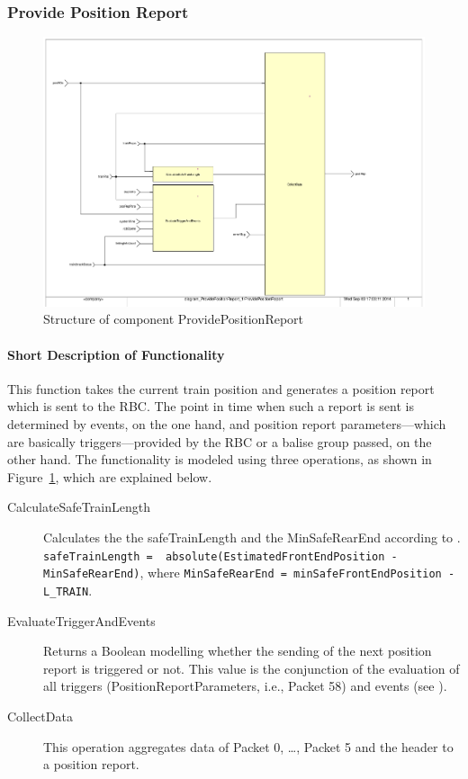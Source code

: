 \subsubsection{Provide Position Report}\label{sss:provposrep}

\begin{figure}[ht]
\centering
\includegraphics[width=\textwidth]{../images/ProvidePositionReport.pdf}
\caption{Structure of component ProvidePositionReport}\label{fig:provideposrep}
\end{figure}

\paragraph{Short Description of Functionality}
This function takes the current train position and generates a position report which is sent to the RBC. The point in time when such a report is sent is determined by events, on the one hand, and position report parameters---which are basically triggers---provided by the RBC or a balise group passed, on the other hand. The functionality is modeled using three operations, as shown in Figure~\ref{fig:provideposrep}, which are explained below.
\begin{description}
	\item[CalculateSafeTrainLength] Calculates the the safeTrainLength and the MinSafeRearEnd according to \cite[Chapter~3.6.5.2.4/5]{subset-026}. \\
\verb+safeTrainLength =  absolute(EstimatedFrontEndPosition - MinSafeRearEnd)+, where
\verb+MinSafeRearEnd = minSafeFrontEndPosition - L_TRAIN+.
	\item[EvaluateTriggerAndEvents] Returns a Boolean modelling whether the sending of the next position report is triggered or not. This value is the conjunction of the evaluation of all triggers (PositionReportParameters, i.e., Packet 58) and events (see \cite[Chapter~3.6.5.1.4]{subset-026}).
	\item[CollectData] This operation aggregates data of Packet 0, \dots, Packet 5 and the header to a position report.
\end{description}

